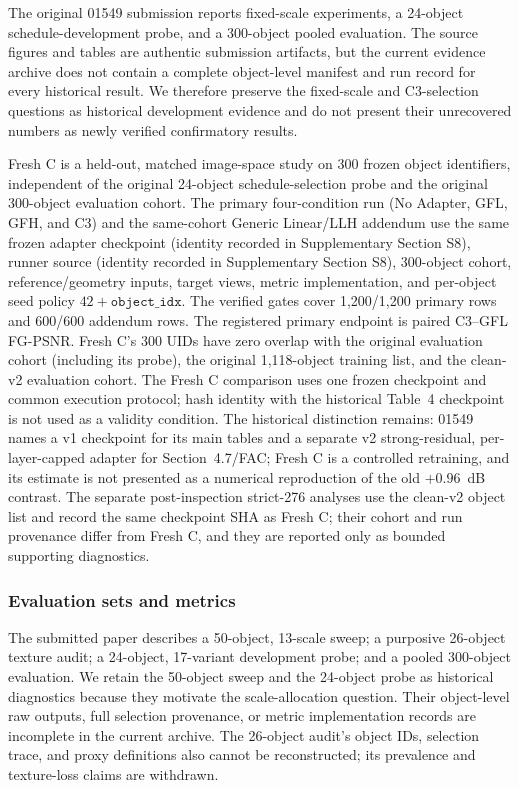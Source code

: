 \documentclass[times,twocolumn,final]{elsarticle}
\begin{document}
The original 01549 submission reports fixed-scale experiments, a 24-object schedule-development probe, and a 300-object pooled evaluation. The source figures and tables are authentic submission artifacts, but the current evidence archive does not contain a complete object-level manifest and run record for every historical result. We therefore preserve the fixed-scale and C3-selection questions as historical development evidence and do not present their unrecovered numbers as newly verified confirmatory results.

Fresh C is a held-out, matched image-space study on 300 frozen object identifiers, independent of the original 24-object schedule-selection probe and the original 300-object evaluation cohort. The primary four-condition run (No Adapter, GFL, GFH, and C3) and the same-cohort Generic Linear/LLH addendum use the same frozen adapter checkpoint (identity recorded in Supplementary Section S8), runner source (identity recorded in Supplementary Section S8), 300-object cohort, reference/geometry inputs, target views, metric implementation, and per-object seed policy $42+\texttt{object\_idx}$. The verified gates cover 1,200/1,200 primary rows and 600/600 addendum rows. The registered primary endpoint is paired C3--GFL FG-PSNR. Fresh C's 300 UIDs have zero overlap with the original evaluation cohort (including its probe), the original 1,118-object training list, and the clean-v2 evaluation cohort. The Fresh C comparison uses one frozen checkpoint and common execution protocol; hash identity with the historical Table~4 checkpoint is not used as a validity condition. The historical distinction remains: 01549 names a v1 checkpoint for its main tables and a separate v2 strong-residual, per-layer-capped adapter for Section~4.7/FAC; Fresh C is a controlled retraining, and its estimate is not presented as a numerical reproduction of the old $+0.96$~dB contrast. The separate post-inspection strict-276 analyses use the clean-v2 object list and record the same checkpoint SHA as Fresh C; their cohort and run provenance differ from Fresh C, and they are reported only as bounded supporting diagnostics.

\subsubsection{Evaluation sets and metrics}

The submitted paper describes a 50-object, 13-scale sweep; a purposive 26-object texture audit; a 24-object, 17-variant development probe; and a pooled 300-object evaluation. We retain the 50-object sweep and the 24-object probe as historical diagnostics because they motivate the scale-allocation question. Their object-level raw outputs, full selection provenance, or metric implementation records are incomplete in the current archive. The 26-object audit's object IDs, selection trace, and proxy definitions also cannot be reconstructed; its prevalence and texture-loss claims are withdrawn.
\end{document}
